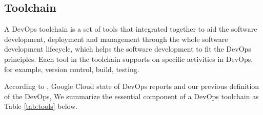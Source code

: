 \subsection{Toolchain}
A DevOps toolchain is a set of tools that integrated together to aid the software development, deployment and management through the whole software development lifecycle, which helps the software development to fit the DevOps principles.\cite{DevOpsto7:online}\cite{Toolchai10:online}\cite{WhatisaD20:online} Each tool in the toolchain supports on specific activities in DevOps, for example, version control, build, testing.
\par
According to \cite{WhatisaD20:online}, Google Cloud state of DevOps reports \cite{forsgrenaccelerate}\cite{velasquez2014state}\cite{forsgren20192019} and our previous definition of the DevOps, We summarize the essential component of a DevOps toolchain as Table \ref{tab:tools} below. 

